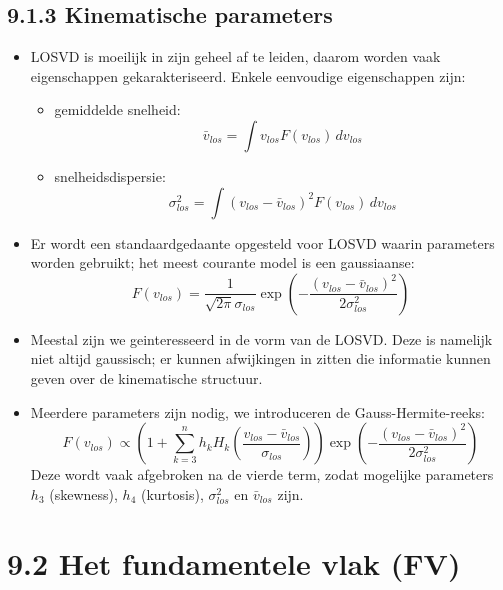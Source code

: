 \documentclass[10pt,a4paper]{article}
\renewenvironment{equation}{\begin{equation*}}{\end{equation*}}
\begin{document}
\subsection*{9.1.3 Kinematische parameters}
\begin{itemize}
  \item LOSVD is moeilijk in zijn geheel af te leiden, daarom worden vaak eigenschappen gekarakteriseerd. Enkele eenvoudige eigenschappen zijn:
  \begin{itemize}
    \item gemiddelde snelheid:
    \begin{equation}
      \bar{v}_{los}=\int v_{los}F(v_{los})\,dv_{los}
      \tag{9.5}
    \end{equation}
    \item snelheidsdispersie:
    \begin{equation}
      \sigma^2_{los}=\int (v_{los}-\bar{v}_{los})^2F(v_{los})\,dv_{los}
      \tag{9.6}
    \end{equation}
  \end{itemize}
  \item Er wordt een standaardgedaante opgesteld voor LOSVD waarin parameters worden gebruikt; het meest courante model is een gaussiaanse:
  \begin{equation}
  F(v_{los})=\frac{1}{\sqrt{2\pi}\sigma_{los}}\exp\left(-\frac{(v_{los}-\bar{v}_{los})^2}{2\sigma_{los}^2}\right)
  \tag{9.7}
  \end{equation}
  \item Meestal zijn we geinteresseerd in de vorm van de LOSVD. Deze is namelijk niet altijd gaussisch; er kunnen afwijkingen in zitten die informatie kunnen geven over de kinematische structuur.
  \item Meerdere parameters zijn nodig, we introduceren de Gauss-Hermite-reeks:
  \begin{equation}
  F(v_{los})\propto\left(1+\sum_{k=3}^nh_kH_k\left(\frac{v_{los}-\bar{v}_{los}}{\sigma_{los}}\right)\right)\exp\left(-\frac{(v_{los}-\bar{v}_{los})^2}{2\sigma_{los}^2}\right)
  \tag{9.8}
  \end{equation}
  Deze wordt vaak afgebroken na de vierde term, zodat mogelijke parameters $h_3$ (skewness), $h_4$ (kurtosis), $\sigma^2_{los}$ en $\bar{v}_{los}$ zijn.
\end{itemize}
\section*{9.2 Het fundamentele vlak (FV)}
\end{document}
